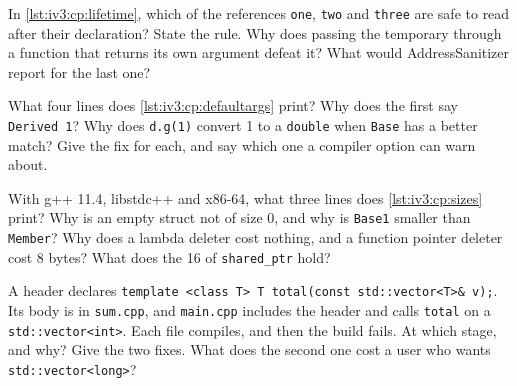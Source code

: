 \begin{question}\label{iq:iv3:cpp:33}
In \cref{lst:iv3:cp:lifetime}, which of the references \texttt{one}, \texttt{two} and \texttt{three} are safe to read after their declaration? State the rule. Why does passing the temporary through a function that returns its own argument defeat it? What would AddressSanitizer report for the last one?
\label{lst:iv3:cp:lifetime}
\end{question}

\begin{question}\label{iq:iv3:cpp:34}
What four lines does \cref{lst:iv3:cp:defaultargs} print? Why does the first say \texttt{Derived 1}? Why does \texttt{d.g(1)} convert 1 to a \texttt{double} when \texttt{Base} has a better match? Give the fix for each, and say which one a compiler option can warn about.
\label{lst:iv3:cp:defaultargs}
\end{question}

\begin{question}\label{iq:iv3:cpp:35}
With g++ 11.4, libstdc++ and x86-64, what three lines does \cref{lst:iv3:cp:sizes} print? Why is an empty struct not of size 0, and why is \texttt{Base1} smaller than \texttt{Member}? Why does a lambda deleter cost nothing, and a function pointer deleter cost 8 bytes? What does the 16 of \texttt{shared\_ptr} hold?
\label{lst:iv3:cp:sizes}
\end{question}

\begin{question}\label{iq:iv3:cpp:36}
A header declares \texttt{template <class T> T total(const std::vector<T>\& v);}. Its body is in \texttt{sum.cpp}, and \texttt{main.cpp} includes the header and calls \texttt{total} on a \texttt{std::vector<int>}. Each file compiles, and then the build fails. At which stage, and why? Give the two fixes. What does the second one cost a user who wants \texttt{std::vector<long>}?
\end{question}

